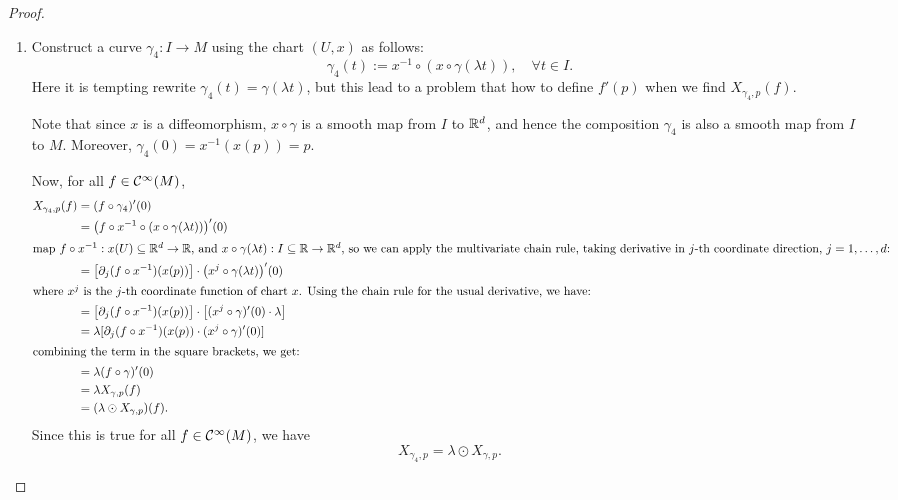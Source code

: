 \begin{proof}
\begin{enumerate}
        \item Construct a curve \(\gamma_4: I \to M\) using the chart \((U, x)\) as follows:
              \begin{equation}
                  \gamma_4(t) := x^{-1} \circ (x \circ \gamma(\lambda t)) , \quad \forall t \in I.
              \end{equation}
              Here it is tempting rewrite \(\gamma_4(t) = \gamma(\lambda t)\), but this lead to a problem that how to define \(f'(p)\) when we find \(X_{\gamma_4, p}(f)\).

              Note that since \(x\) is a diffeomorphism, \(x \circ \gamma\) is a smooth map from \(I\) to \(\mathbb R^d\), and hence the composition \(\gamma_4\) is also a smooth map from \(I\) to \(M\). Moreover, \(\gamma_4(0) = x^{-1}(x(p)) = p\).

              Now, for all \(f \in \mathcal C^\infty(M)\),
              \begin{align*}
                  X_{\gamma_4, p}(f) & = (f \circ \gamma_4)'(0)                                                                   \\
                                     & = \qty(f \circ x^{-1} \circ (x \circ \gamma(\lambda t)))'(0)                               \\
                  \intertext{map \(f \circ x^{-1}: x(U) \subseteq \mathbb R^d \to \mathbb R\), and \(x \circ \gamma(\lambda t): I \subseteq \mathbb R\to \mathbb R^d\), so we can apply the multivariate chain rule, taking derivative in \(j\)-th coordinate direction, \(j = 1, \ldots, d\):}
                                     & = \qty[\partial_j (f \circ x^{-1})(x(p))] \cdot \qty(x^j \circ \gamma(\lambda t))'(0)      \\
                  \shortintertext{where \(x^j\) is the \(j\)-th coordinate function of chart \(x\). Using the chain rule for the usual derivative, we have:}
                                     & = \qty[\partial_j (f \circ x^{-1})(x(p))] \cdot \qty[(x^j \circ \gamma)'(0) \cdot \lambda] \\
                                     & = \lambda [\partial_j (f \circ x^{-1})(x(p)) \cdot (x^j \circ \gamma)'(0)]                 \\
                  \shortintertext{combining the term in the square brackets, we get:}
                                     & = \lambda (f \circ \gamma)'(0)                                                             \\
                                     & = \lambda X_{\gamma, p}(f)                                                                 \\
                                     & = (\lambda \odot X_{\gamma, p})(f).
              \end{align*}
              Since this is true for all \(f \in \mathcal C^\infty(M)\), we have
              \begin{equation}
                  X_{\gamma_4, p} = \lambda \odot X_{\gamma, p}.
              \end{equation}
    \end{enumerate}
\end{proof}
